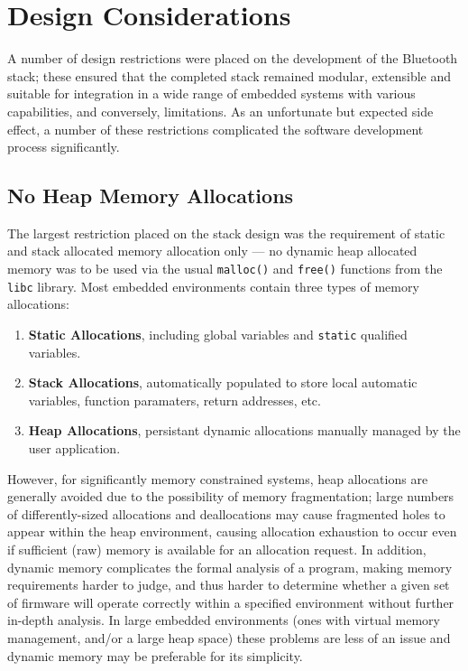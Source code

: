 \section{Design Considerations}

A number of design restrictions were placed on the development of the Bluetooth stack; these ensured that the completed stack remained modular, extensible and suitable for integration in a wide range of embedded systems with various capabilities, and conversely, limitations. As an unfortunate but expected side effect, a number of these restrictions complicated the software development process significantly.

\FloatBarrier
\subsection{No Heap Memory Allocations}

The largest restriction placed on the stack design was the requirement of static and stack allocated memory allocation only --- no dynamic heap allocated memory was to be used via the usual \lstinline{malloc()} and \lstinline{free()} functions from the \texttt{libc} library. Most embedded environments contain three types of memory allocations:

\begin{enumerate}
	\item \textbf{Static Allocations}, including global variables and \lstinline{static} qualified variables.
	\item \textbf{Stack Allocations}, automatically populated to store local automatic variables, function paramaters, return addresses, etc.
	\item \textbf{Heap Allocations}, persistant dynamic allocations manually managed by the user application.
\end{enumerate}

However, for significantly memory constrained systems, heap allocations are generally avoided due to the possibility of memory fragmentation; large numbers of differently-sized allocations and deallocations may cause fragmented holes to appear within the heap environment, causing allocation exhaustion to occur even if sufficient (raw) memory is available for an allocation request. In addition, dynamic memory complicates the formal analysis of a program, making memory requirements harder to judge, and thus harder to determine whether a given set of firmware will operate correctly within a specified environment without further in-depth analysis. In large embedded environments (ones with virtual memory management, and/or a large heap space) these problems are less of an issue and dynamic memory may be preferable for its simplicity.

